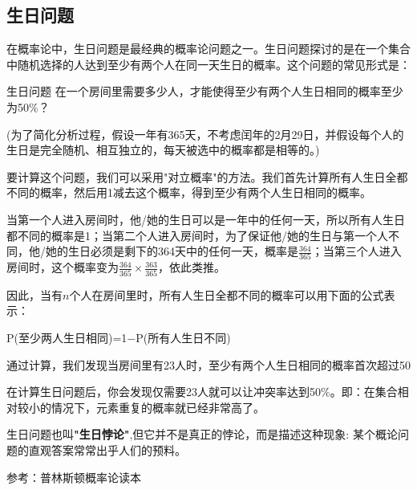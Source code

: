 
\subsection{生日问题}

在概率论中，生日问题是最经典的概率论问题之一。生日问题探讨的是在一个集合中随机选择的人达到至少有两个人在同一天生日的概率。这个问题的常见形式是：

\begin{example}{生日问题}
在一个房间里需要多少人，才能使得至少有两个人生日相同的概率至少为50\%？

(为了简化分析过程，假设一年有365天，不考虑闰年的2月29日，并假设每个人的生日是完全随机、相互独立的，每天被选中的概率都是相等的。)
\end{example}

要计算这个问题，我们可以采用"对立概率"的方法。我们首先计算所有人生日全都不同的概率，然后用1减去这个概率，得到至少有两个人生日相同的概率。

当第一个人进入房间时，他/她的生日可以是一年中的任何一天，所以所有人生日都不同的概率是1；当第二个人进入房间时，为了保证他/她的生日与第一个人不同，他/她的生日必须是剩下的364天中的任何一天，概率是$\frac{364}{365}$；当第三个人进入房间时，这个概率变为$\frac{364}{365} \times \frac{363}{365}$，依此类推。

因此，当有$n$个人在房间里时，所有人生日全都不同的概率可以用下面的公式表示：

P(至少两人生日相同)=1−P(所有人生日不同)

通过计算，我们发现当房间里有23人时，至少有两个人生日相同的概率首次超过50%

在计算生日问题后，你会发现仅需要23人就可以让冲突率达到50\%。即：在集合相对较小的情况下，元素重复的概率就已经非常高了。

生日问题也叫\textbf{"生日悖论"},但它并不是真正的悖论，而是描述这种现象: 某个概论问题的直观答案常常出乎人们的预料。




参考：普林斯顿概率论读本
